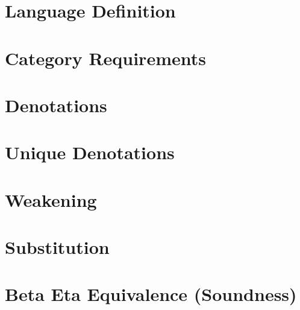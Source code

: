 \documentclass{report}
\begin{document}
\tableofcontents
\chapter{Language Definition}
\LanguageDefinition

\chapter{Category Requirements}
\CategoryRequirements

\chapter{Denotations}
\Denotations

\chapter{Unique Denotations}
\UniqueDenotations

\chapter{Weakening}
\Weakening

\chapter{Substitution}
\Substitution

\chapter{Beta Eta Equivalence (Soundness)}
\BetaEtaEquivalence
    
\end{document}
